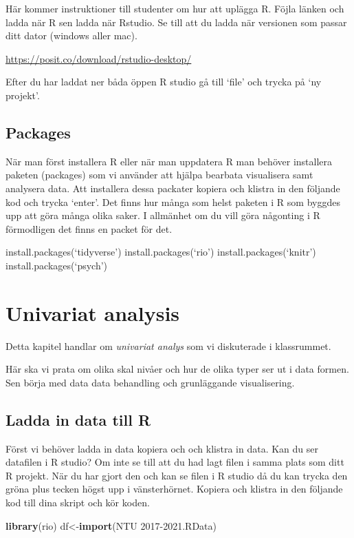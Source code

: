 \documentclass[
]{book}
\newenvironment{Shaded}{\begin{snugshade}}{\end{snugshade}}
\newcommand{\FunctionTok}[1]{\textcolor[rgb]{0.13,0.29,0.53}{\textbf{#1}}}
\newcommand{\NormalTok}[1]{#1}
\newcommand{\OtherTok}[1]{\textcolor[rgb]{0.56,0.35,0.01}{#1}}
\newcommand{\StringTok}[1]{\textcolor[rgb]{0.31,0.60,0.02}{#1}}
\begin{document}
Här kommer instruktioner till studenter om hur att uplägga
R. Föjla länken och ladda när R sen ladda när Rstudio. Se till att du ladda när versionen som passar ditt dator (windows aller mac).

\url{https://posit.co/download/rstudio-desktop/}

Efter du har laddat ner båda öppen R studio gå till `file' och trycka på `ny projekt'.

\section{Packages}\label{packages}

När man först installera R eller när man uppdatera R man behöver installera paketen (packages) som vi använder att hjälpa bearbata visualisera samt analysera data. Att installera dessa packater kopiera och klistra in den följande kod och trycka `enter'. Det finns hur många som helst paketen i R som byggdes upp att göra många olika saker. I allmänhet om du vill göra någonting i R förmodligen det finns en packet för det.

install.packages(`tidyverse')
install.packages(`rio')
install.packages(`knitr')
install.packages(`psych')

\chapter{Univariat analysis}\label{univariat-analysis}

Detta kapitel handlar om \emph{univariat analys} som vi diskuterade i klassrummet.

Här ska vi prata om olika skal nivåer och hur de olika typer ser ut i data formen. Sen börja med data data behandling och grunläggande visualisering.

\section{Ladda in data till R}\label{ladda-in-data-till-r}

Först vi behöver ladda in data kopiera och och klistra in data. Kan du ser datafilen i R studio? Om inte se till att du had lagt filen i samma plats som ditt R projekt. När du har gjort den och kan se filen i R studio då du kan trycka den gröna plus tecken högst upp i vänsterhörnet. Kopiera och klistra in den följande kod till dina skript och kör koden.

\begin{Shaded}
\begin{Highlighting}[]
\FunctionTok{library}\NormalTok{(rio)}
\NormalTok{df}\OtherTok{\textless{}{-}}\FunctionTok{import}\NormalTok{(}\StringTok{\textquotesingle{}NTU 2017{-}2021.RData\textquotesingle{}}\NormalTok{)}
\end{Highlighting}
\end{Shaded}
\end{document}
